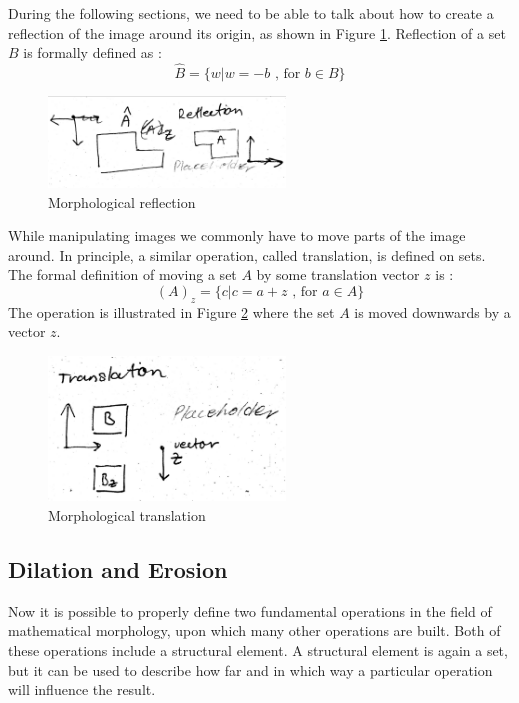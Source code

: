 \documentclass[
  digital,     %
  oneside,     %
  nosansbold,  %
  nocolorbold, %
  lof,         %
  lot,         %
]{fithesis4}
\begin{document}
During the following sections, we need to be able to talk about how to create a
reflection of the image around its origin, as shown in Figure
\ref{fig:morp_refl}. Reflection  of a set $B$ is formally defined as \cite{gonzalez2002}:
$$\hat{B} = \{w | w=-b \text{ , for } b \in B\}$$
\begin{figure}
    \begin{center}
        \includegraphics[width=6.3cm]{resources/morph_reflection.jpg}
    \end{center}
    \caption{Morphological reflection} %
    \label{fig:morp_refl}
\end{figure}

While manipulating images we commonly have to move parts of the image around.
In principle, a similar operation, called translation, is defined on sets. The
formal definition of moving a set $A$ by some translation vector $z$ is
\cite{gonzalez2002}:
$$(A)_z = \{c | c = a + z\text{ , for } a \in A\}$$
The operation is illustrated in Figure \ref{fig:morph_translation} where the set
$A$ is moved downwards by a vector $z$.
\begin{figure}
    \begin{center}
        \includegraphics[width=6.3cm]{resources/morph_translation.jpg}
    \end{center}
    \caption{Morphological translation} %
    \label{fig:morph_translation}
\end{figure}

\subsection{Dilation and Erosion}
Now it is possible to properly define two fundamental operations in the field of
mathematical morphology, upon which many other operations are built. Both of
these operations include a structural element. A structural element is again a
set, but it can be used to describe how far and in which way a particular
operation will influence the result.
\end{document}
